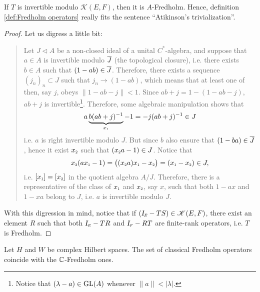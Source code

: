 \begin{proposicao}\label{prop: I-ST compacto ===>  T fredholm}
    If $T$ is invertible modulo $\mathscr K(E,F)$, then it is $A$-Fredholm. Hence, definition \ref{def:Fredholm operators} really fits the sentence ``Atikinson's trivialization''.

    \begin{proof}
    Let us digress a little bit:
    \vspace{-0.7cm}
    \begin{quote}
        \begin{observacao}
        Let $J \triangleleft A$ be a non-closed ideal of a unital $C^*$-algebra, and suppose that $a\in A$ is invertible modulo $\overline{J}$ (the topological closure), i.e. there exists $b \in A$ such that $(1-ab)\in \overline{J}$. Therefore, there exists a sequence $(j_n)_n \subset J$ such that $j_n \to (1-ab)$, which means that at least one of then, say $j$, obeys $\|1-ab - j\| < 1$. Since $ab+j = 1 - (1-ab-j)$, $ab+j$ is invertible\footnote{Notice that $(\lambda - a) \in \operatorname{GL}(A)$ whenever $\|a\|<|\lambda|$.}. Therefore, some algebraic manipulation shows that
        \begin{equation*}
            a\underbrace{b(ab+j)^{-1}}_{\sub x1}- 1 = -j(ab+j)^{-1} \in J
        \end{equation*}
        i.e. $a$ is right invertible modulo $J$. But since $b$ also ensure that $(1-ba) \in \overline{J}$, hence it exist $\sub x2$ such that $(\sub x2a-1) \in J$. Notice that
        \begin{equation*}
            \sub x2(a\sub x1 - 1) = \big((\sub x2a)\sub x1 - \sub x2\big) = (\sub x1 - \sub x2) \in J,
        \end{equation*}
        i.e. $[\sub x1] = [\sub x2]$ in the quotient algebra $A/J$. Therefore, there is a representative of the class of $\sub x1$ and $\sub x2$, say $x$, such that both $1-ax$ and $1-xa$ belong to $J$, i.e. $a$ is invertible modulo $J$.
        \end{observacao}
    \end{quote}
    With this digression in mind, notice that if $(\sub\Id E - TS) \in \mathscr K(E,F)$, there exist an element $R$ such that both $\sub\Id E - TR$ and $\sub\Id F-RT$ are finite-rank operators, i.e. $T$ is Fredholm.
    \end{proof}
\end{proposicao}


\begin{observacao}
Let $H$ and $W$ be complex Hilbert spaces. The set of classical Fredholm operators coincide with the $\operatorname{\mathbb{C}}$-Fredholm ones. 
\end{observacao}

